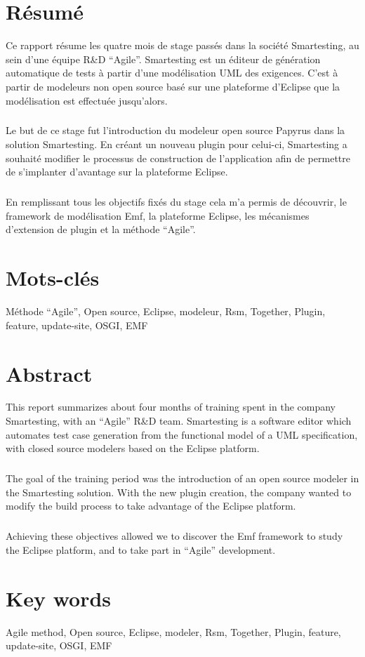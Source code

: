 \pagestyle{empty} %

\section*{Résumé}
Ce rapport résume les quatre mois de stage passés dans la société Smartesting, au sein d'une équipe R\&D ``Agile''.
Smartesting est un éditeur de génération automatique de tests à partir d'une modélisation UML des exigences. C'est à partir de modeleurs non open source basé sur une plateforme d'Eclipse que la modélisation est effectuée jusqu'alors.
 
\subparagraph*{}
Le but de ce stage fut l'introduction du modeleur open source Papyrus dans la solution Smartesting.
En créant un nouveau plugin pour celui-ci, Smartesting a souhaité modifier le processus de construction de l'application afin de permettre de s'implanter d'avantage sur la plateforme Eclipse.
\subparagraph*{}
En remplissant tous les objectifs fixés du stage cela m'a permis de découvrir, le framework de modélisation Emf, la plateforme Eclipse, les mécanismes d'extension de plugin et la méthode ``Agile''.

\section*{Mots-clés}
Méthode ``Agile'', Open source, Eclipse, modeleur, Rsm, Together, Plugin, feature, update-site, OSGI, EMF
\vfill

\section*{Abstract}

This report summarizes about four months of training spent in the company Smartesting, with an ``Agile'' R\&D team. Smartesting is a software editor which automates test case generation from the functional model of a UML specification, with closed source modelers based on the Eclipse platform.
\subparagraph*{}
The goal of the training period was the introduction of an open source modeler in the Smartesting solution. With the new plugin creation, the company wanted to modify the build process to take advantage of the Eclipse platform.
\subparagraph*{}
Achieving these objectives allowed we to discover the Emf framework to study the Eclipse platform, and to take part in ``Agile'' development.

\section*{Key words}
Agile method, Open source, Eclipse, modeler, Rsm, Together, Plugin, feature, update-site, OSGI, EMF